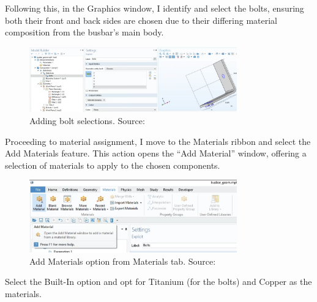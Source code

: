 Following this, in the Graphics window, I identify and select the bolts, ensuring both their front and back sides are chosen due to their differing material composition from the busbar's main body.

\begin{figure}[H]
  \centering
  \includegraphics[width=0.8\textwidth]{Chapters/Figures/Chapter 3 Figures/Bolts Selection.png}
  \caption{Adding bolt selections. Source: \cite{multiphysics__modeling_nodate}}
  \label{fig:Adding bolt selections}
\end{figure}

Proceeding to material assignment, I move to the Materials ribbon and select the Add Materials feature. This action opens the ``Add Material'' window, offering a selection of materials to apply to the chosen components.

\begin{figure}[H]
  \centering
  \includegraphics[width=0.8\textwidth]{Chapters/Figures/Chapter 3 Figures/Add Material Button.png}
  \caption{Add Materials option from Materials tab. Source: \cite{multiphysics__modeling_nodate}}
  \label{fig:Add Materials option from Materials tab.}
\end{figure}

Select the Built-In option and opt for Titanium (for the bolts) and Copper as the materials.

